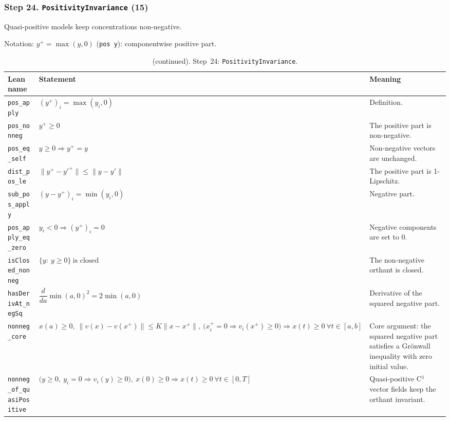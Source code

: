 \subsubsection*{Step 24. \texttt{PositivityInvariance} (15)}
Quasi-positive models keep concentrations non-negative.

{\small\raggedright Notation: $y^+=\max(y,0)$ (\texttt{pos y}): componentwise positive part.}

\addtocounter{table}{-1}
{\small
\begin{longtable}{@{}>{\raggedright\arraybackslash}p{3.6cm}>{\raggedright\arraybackslash}p{6.6cm}>{\raggedright\arraybackslash}p{5.6cm}@{}}
\caption[]{(continued). Step~24: \texttt{PositivityInvariance}.}\\
\toprule
Lean name & Statement & Meaning \\
\midrule
\endhead
\texttt{pos\_\allowbreak{}apply} & $\displaystyle (y^+)_i=\max(y_i,0)$ & Definition. \\[3pt]
\texttt{pos\_\allowbreak{}nonneg} & $\displaystyle y^+\ge0$ & The positive part is non-negative. \\[3pt]
\texttt{pos\_\allowbreak{}eq\_\allowbreak{}self} & $\displaystyle y\ge0\Rightarrow y^+=y$ & Non-negative vectors are unchanged. \\[3pt]
\texttt{dist\_\allowbreak{}pos\_\allowbreak{}le} & $\displaystyle \|y^+-y'^+\|\le\|y-y'\|$ & The positive part is 1-Lipschitz. \\[3pt]
\texttt{sub\_\allowbreak{}pos\_\allowbreak{}apply} & $\displaystyle (y-y^+)_i=\min(y_i,0)$ & Negative part. \\[3pt]
\texttt{pos\_\allowbreak{}apply\_\allowbreak{}eq\_\allowbreak{}zero} & $\displaystyle y_i<0\Rightarrow(y^+)_i=0$ & Negative components are set to 0. \\[3pt]
\texttt{isClosed\_\allowbreak{}nonneg} & $\displaystyle \{y:\ y\ge0\}\ \text{is closed}$ & The non-negative orthant is closed. \\[3pt]
\texttt{hasDerivAt\_\allowbreak{}negSq} & $\displaystyle \dfrac{d}{da}\min(a,0)^2=2\min(a,0)$ & Derivative of the squared negative part. \\[3pt]
\texttt{nonneg\_\allowbreak{}core} & $\displaystyle x(a)\ge0,\ \|v(x)-v(x^+)\|\le K\|x-x^+\|,\ \bigl(x^+_i=0\Rightarrow v_i(x^+)\ge0\bigr)\Rightarrow x(t)\ge0\ \forall t\in[a,b]$ & Core argument: the squared negative part satisfies a Gr\"onwall inequality with zero initial value. \\[3pt]
\texttt{nonneg\_\allowbreak{}of\_\allowbreak{}quasiPositive} & $\displaystyle \bigl(y\ge0,\ y_i=0\Rightarrow v_i(y)\ge0\bigr),\ x(0)\ge0\Rightarrow x(t)\ge0\ \forall t\in[0,T]$ & Quasi-positive C$^1$ vector fields keep the orthant invariant. \\[3pt]

\end{longtable}}
